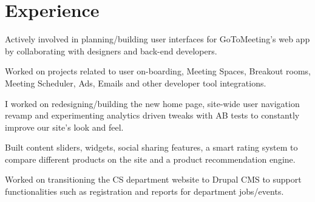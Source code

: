 \documentclass[]{my-resume-openfont}
\begin{document}
\begin{minipage}[t]{0.66\textwidth} 


\section{Experience}

\vspace{\topsep} %
\begin{tightemize}
\item Actively involved in planning/building user interfaces for GoToMeeting's web app by collaborating with designers and back-end developers.
\item Worked on projects related to user on-boarding, Meeting Spaces, Breakout rooms, Meeting Scheduler, Ads, Emails and other developer tool integrations.
\end{tightemize}
\sectionsep

\begin{tightemize}
\item I worked on redesigning/building the new home page, site-wide user navigation revamp and experimenting analytics driven tweaks with AB tests to constantly improve our site’s look and feel.
\item Built content sliders, widgets, social sharing features, a smart rating system to compare different products on the site and a product recommendation engine.
\end{tightemize}
\sectionsep

\begin{tightemize}
\item Worked on transitioning the CS department website to Drupal CMS to support functionalities such as registration and reports for department jobs/events.
\end{tightemize}
\sectionsep



\end{minipage}
\end{document}
